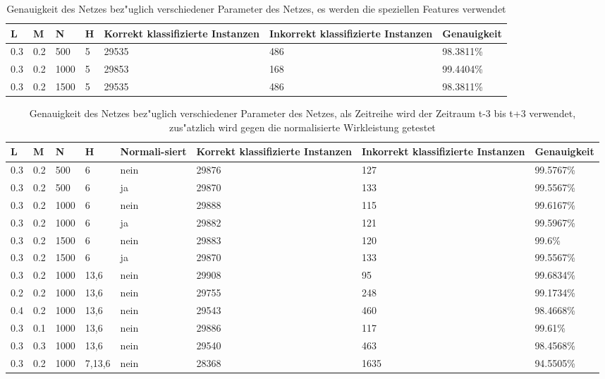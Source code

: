 \begin{table}[p]
\begin{tabular}{l|l|l|l|p{3cm}|p{3cm}|l}
L & M & N & H & Korrekt klassifizierte Instanzen & Inkorrekt klassifizierte Instanzen & Genauigkeit  \\
\hline
0.3 & 0.2 & 500 & 5 & 29535 & 486 & 98.3811\% \\
0.3 & 0.2 & 1000 & 5 & 29853 & 168 & 99.4404\% \\
0.3 & 0.2 & 1500 & 5 & 29535 & 486 & 98.3811\% \\
\end{tabular}
\caption[Spezielle Features]{Genauigkeit des Netzes bez"uglich verschiedener Parameter des Netzes, es werden die speziellen Features verwendet}
\label{EvalExp}
\end{table}

\begin{table}[p]
\begin{tabular}{l|l|l|l|p{1.5cm}|p{3cm}|p{3cm}|l}
L & M & N & H & Normali-siert & Korrekt klassifizierte Instanzen & Inkorrekt klassifizierte Instanzen & Genauigkeit  \\
\hline
0.3 & 0.2 & 500 & 6 & nein & 29876 & 127 & 99.5767\% \\
0.3 & 0.2 & 500 & 6 & ja & 29870 & 133 & 99.5567\% \\
0.3 & 0.2 & 1000 & 6 & nein & 29888 & 115 & 99.6167\% \\
0.3 & 0.2 & 1000 & 6 & ja & 29882 & 121 & 99.5967\% \\
0.3 & 0.2 & 1500 & 6 & nein & 29883 & 120 & 99.6\% \\
0.3 & 0.2 & 1500 & 6 & ja & 29870 & 133 & 99.5567\% \\
\hline
0.3 & 0.2 & 1000 & 13,6 & nein & 29908 & 95 & 99.6834\% \\
0.2 & 0.2 & 1000 & 13,6 & nein & 29755 & 248 & 99.1734\% \\
0.4 & 0.2 & 1000 & 13,6 & nein & 29543 & 460 & 98.4668\% \\
0.3 & 0.1 & 1000 & 13,6 & nein & 29886 & 117 & 99.61\% \\
0.3 & 0.3 & 1000 & 13,6 & nein & 29540 & 463 & 98.4568\% \\
0.3 & 0.2 & 1000 & 7,13,6 & nein & 28368 & 1635 & 94.5505\%
\end{tabular}
\caption[Parameterver"anderungen beste Zeitreihe]{Genauigkeit des Netzes bez"uglich verschiedener Parameter des Netzes, als Zeitreihe wird der Zeitraum t-3 bis t+3 verwendet, zus"atzlich wird gegen die normalisierte Wirkleistung getestet}
\label{EvalParam}
\end{table}


